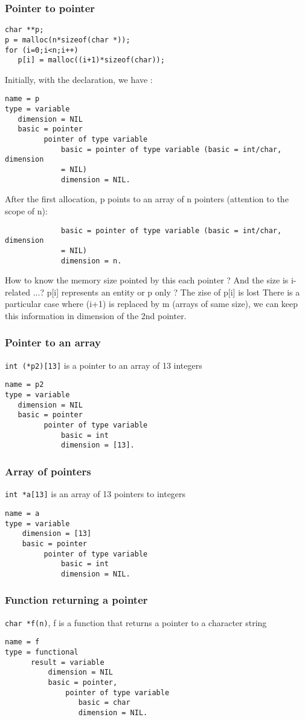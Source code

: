 \documentclass[a4paper]{article}
\begin{document}
\subsubsection{Pointer to pointer}
\begin{verbatim}
char **p;
p = malloc(n*sizeof(char *));
for (i=0;i<n;i++)
   p[i] = malloc((i+1)*sizeof(char));
\end{verbatim}
Initially, with the declaration, we have :
\begin{verbatim}
name = p
type = variable
   dimension = NIL
   basic = pointer
         pointer of type variable
             basic = pointer of type variable (basic = int/char, dimension
             = NIL)
             dimension = NIL.
\end{verbatim}
After the first allocation, p points to an array of n pointers (attention
to the scope of n):
\begin{verbatim}
             basic = pointer of type variable (basic = int/char, dimension
             = NIL)
             dimension = n.
\end{verbatim}
How to know the memory size pointed by this each pointer ? And the size is
i-related ...? p[i] represents an entity or p only ? The zise of p[i] is
lost  There is a particular case where (i+1) is replaced by m (arrays of
same size), we can keep this information in dimension of the 2nd pointer. 

\subsubsection{Pointer to an array}
\verb/int (*p2)[13]/ is a pointer to an array of 13 integers
\begin{verbatim}
name = p2
type = variable
   dimension = NIL
   basic = pointer
         pointer of type variable
             basic = int
             dimension = [13].
\end{verbatim}
\subsubsection{Array of pointers}
\verb/int *a[13]/ is an array of 13 pointers to integers
\begin{verbatim}
name = a
type = variable
    dimension = [13]
    basic = pointer
         pointer of type variable
             basic = int
             dimension = NIL.
\end{verbatim}
\subsubsection{Function returning a pointer}
\verb/char *f(n)/, f is a function that returns a pointer to a character
string
\begin{verbatim}
name = f
type = functional 
      result = variable
          dimension = NIL
          basic = pointer,
              pointer of type variable
                 basic = char
                 dimension = NIL. 
\end{verbatim}
\end{document}
